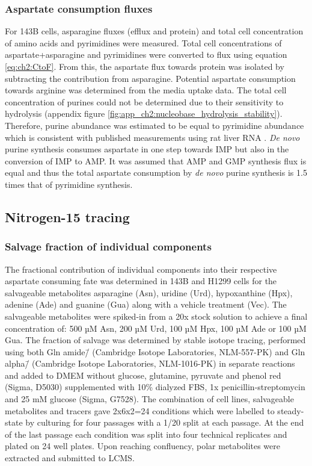 \subsubsection{Aspartate consumption fluxes}
For 143B cells, asparagine fluxes (efflux and protein) and total cell concentration of amino acids and pyrimidines were measured.
Total cell concentrations of aspartate+asparagine and pyrimidines were converted to flux using equation \ref{eq:ch2:CtoF}.
From this, the aspartate flux towards protein was isolated by subtracting the contribution from asparagine.
Potential aspartate consumption towards arginine was determined from the media uptake data.
The total cell concentration of purines could not be determined due to their sensitivity to hydrolysis (appendix figure \ref{fig:app_ch2:nucleobase_hydrolysis_stability}).
Therefore, purine abundance was estimated to be equal to pyrimidine abundance which is consistent with published measurements using rat liver RNA \cite{Lipshitz1960-jw}.
\textit{De novo} purine synthesis consumes aspartate in one step towards IMP but also in the conversion of IMP to AMP.
It was assumed that AMP and GMP synthesis flux is equal and thus the total aspartate consumption by \textit{de novo} purine synthesis is 1.5 times that of pyrimidine synthesis.


\subsection{Nitrogen-15 tracing}

\subsubsection{Salvage fraction of individual components}
The fractional contribution of individual components into their respective aspartate consuming fate was determined in 143B and H1299 cells for the salvageable metabolites asparagine (Asn), uridine (Urd), hypoxanthine (Hpx), adenine (Ade) and guanine (Gua) along with a vehicle treatment (Vec).
The salvageable metabolites were spiked-in from a 20x stock solution to achieve a final concentration of: 500 µM Asn, 200 µM Urd, 100 µM Hpx, 100 µM Ade or 100 µM Gua.
The fraction of salvage was determined by stable isotope tracing, performed using both Gln amide\=/\hNi{} (Cambridge Isotope Laboratories, NLM-557-PK) and Gln alpha\=/\hNi{} (Cambridge Isotope Laboratories, NLM-1016-PK) in separate reactions and added to DMEM without glucose, glutamine, pyruvate and phenol red (Sigma, D5030) supplemented with 10\% dialyzed FBS, 1x penicillin-streptomycin and 25 mM glucose (Sigma, G7528).
The combination of cell lines, salvageable metabolites and tracers gave 2x6x2=24 conditions which were labelled to steady-state by culturing for four passages with a 1/20 split at each passage.
At the end of the last passage each condition was split into four technical replicates and plated on 24 well plates.
Upon reaching confluency, polar metabolites were extracted and submitted to LCMS.

